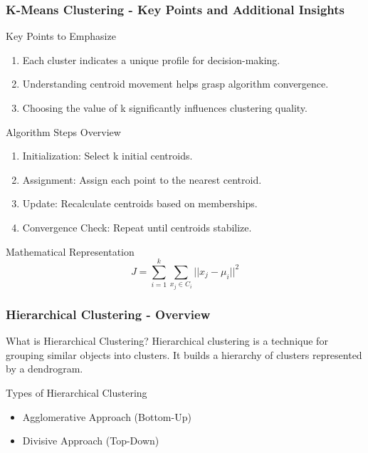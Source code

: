 \documentclass[aspectratio=169]{beamer}
\begin{document}
\begin{frame}[fragile]
    \frametitle{K-Means Clustering - Key Points and Additional Insights}
    \begin{block}{Key Points to Emphasize}
        \begin{enumerate}
            \item Each cluster indicates a unique profile for decision-making.
            \item Understanding centroid movement helps grasp algorithm convergence.
            \item Choosing the value of k significantly influences clustering quality.
        \end{enumerate}
    \end{block}

    \begin{block}{Algorithm Steps Overview}
        \begin{enumerate}
            \item Initialization: Select k initial centroids.
            \item Assignment: Assign each point to the nearest centroid.
            \item Update: Recalculate centroids based on memberships.
            \item Convergence Check: Repeat until centroids stabilize.
        \end{enumerate}
    \end{block}

    \begin{block}{Mathematical Representation}
        \begin{equation}
            J = \sum_{i=1}^{k} \sum_{x_j \in C_i} ||x_j - \mu_i||^2
        \end{equation}
    \end{block}
\end{frame}

\begin{frame}[fragile]
    \frametitle{Hierarchical Clustering - Overview}
    \begin{block}{What is Hierarchical Clustering?}
        Hierarchical clustering is a technique for grouping similar objects into clusters.
        It builds a hierarchy of clusters represented by a dendrogram.
    \end{block}
    
    \begin{block}{Types of Hierarchical Clustering}
        \begin{itemize}
            \item Agglomerative Approach (Bottom-Up)
            \item Divisive Approach (Top-Down)
        \end{itemize}
    \end{block}
\end{frame}
\end{document}
